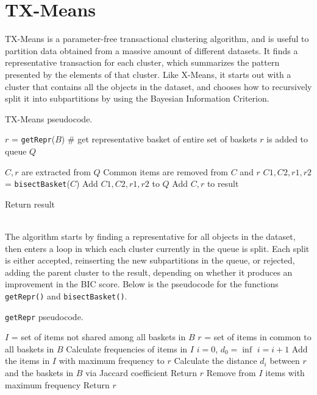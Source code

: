 \section{TX-Means}

TX-Means is a parameter-free transactional clustering algorithm, and is useful to partition data obtained from a massive amount of different datasets. It finds a representative transaction for each cluster, which summarizes the pattern presented by the elements of that cluster. Like X-Means, it starts out with a cluster that contains all the objects in the dataset, and chooses how to recursively split it into subpartitions by using the Bayesian Information Criterion.
\begin{algorithm}
\caption{TX-Means pseudocode.}
\begin{algorithmic}[1]
    \State $r$ = \texttt{getRepr}($B$) \# get representative basket of entire set of baskets
    \State $r$ is added to queue $Q$

        \State $C, r$ are extracted from $Q$
        \State Common items are removed from $C$ and $r$
        \State $C1,C2,r1,r2$ = \texttt{bisectBasket}($C$)
            \State Add $C1,C2,r1,r2$ to $Q$
        \Else
            \State Add $C, r$ to result 
        \EndIf
    \EndWhile

    \State Return result
\end{algorithmic}
\end{algorithm} \\
The algorithm starts by finding a representative for all objects in the dataset, then enters a loop in which each cluster currently in the queue is split. Each split is either accepted, reinserting the new subpartitions in the queue, or rejected, adding the parent cluster to the result, depending on whether it produces an improvement in the BIC score. Below is the pseudocode for the functions \texttt{getRepr()} and \texttt{bisectBasket()}.

\begin{algorithm}
\caption{\texttt{getRepr} pseudocode.}
\begin{algorithmic}[1]
    \State $I$ = set of items not shared among all baskets in $B$
    \State $r$ = set of items in common to all baskets in $B$
    \State Calculate frequencies of items in $I$
    \State $i = 0$, $d_0 = \inf$
        \State $i = i + 1$
        \State Add the items in $I$ with maximum frequency to $r$
        \State Calculate the distance $d_i$ between $r$ and the baskets in $B$ via Jaccard coefficient
            \State Return $r$
        \Else
            \State Remove from $I$ items with maximum frequency
        \EndIf
    \EndWhile 
    \State Return $r$
\end{algorithmic}
\end{algorithm}

